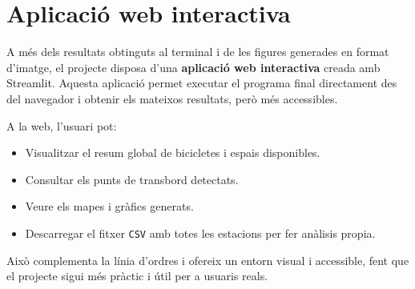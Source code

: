 \section{Aplicació web interactiva}

A més dels resultats obtinguts al terminal i de les figures generades en format d’imatge,
el projecte disposa d’una \textbf{aplicació web interactiva} creada amb Streamlit.
Aquesta aplicació permet executar el programa final directament des del navegador i obtenir els mateixos resultats, però més accessibles.

A la web, l’usuari pot:
\begin{itemize}
    \item Visualitzar el resum global de bicicletes i espais disponibles.
    \item Consultar els punts de transbord detectats.
    \item Veure els mapes i gràfics generats.
    \item Descarregar el fitxer \texttt{CSV} amb totes les estacions per fer anàlisis propia.
\end{itemize}

Això complementa la línia d'ordres i ofereix un entorn visual i accessible,
fent que el projecte sigui més pràctic i útil per a usuaris reals.
